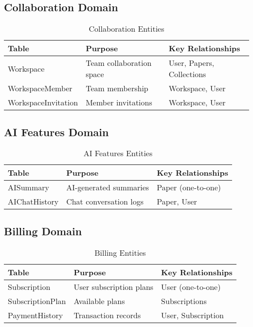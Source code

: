 \subsection{Collaboration Domain}

\begin{table}[H]
\centering
\caption{Collaboration Entities}
\label{tab:erd-collaboration-domain}
\begin{tabular}{@{}llp{6cm}@{}}
\toprule
\textbf{Table} & \textbf{Purpose} & \textbf{Key Relationships} \\
\midrule
Workspace & Team collaboration space & User, Papers, Collections \\
WorkspaceMember & Team membership & Workspace, User \\
WorkspaceInvitation & Member invitations & Workspace, User \\
\bottomrule
\end{tabular}
\end{table}

\subsection{AI Features Domain}

\begin{table}[H]
\centering
\caption{AI Features Entities}
\label{tab:erd-ai-domain}
\begin{tabular}{@{}llp{6cm}@{}}
\toprule
\textbf{Table} & \textbf{Purpose} & \textbf{Key Relationships} \\
\midrule
AISummary & AI-generated summaries & Paper (one-to-one) \\
AIChatHistory & Chat conversation logs & Paper, User \\
\bottomrule
\end{tabular}
\end{table}

\subsection{Billing Domain}

\begin{table}[H]
\centering
\caption{Billing Entities}
\label{tab:erd-billing-domain}
\begin{tabular}{@{}llp{6cm}@{}}
\toprule
\textbf{Table} & \textbf{Purpose} & \textbf{Key Relationships} \\
\midrule
Subscription & User subscription plans & User (one-to-one) \\
SubscriptionPlan & Available plans & Subscriptions \\
PaymentHistory & Transaction records & User, Subscription \\
\bottomrule
\end{tabular}
\end{table}

